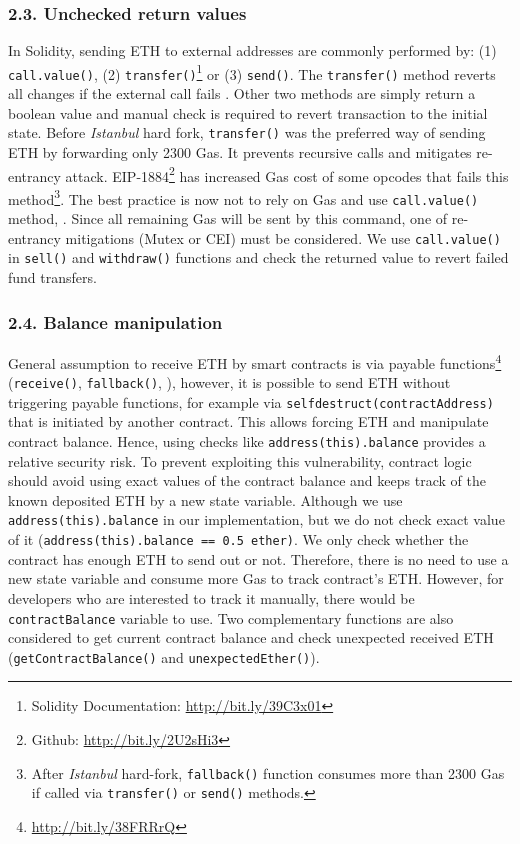 \subsubsection*{2.3. Unchecked return values}
In Solidity, sending ETH to external addresses are commonly performed by: (1) \texttt{call.value()}, (2) \texttt{transfer()}\footnote{Solidity Documentation: \url{http://bit.ly/39C3x01}} or (3) \texttt{send()}. The \texttt{transfer()} method reverts all changes if the external call fails \cite{SoliditySendEther}. Other two methods are simply return a boolean value and manual check is required to revert transaction to the initial state. Before \textit{Istanbul} hard fork\cite{IstanbulUpgrades}, \texttt{transfer()} was the preferred way of sending ETH by forwarding only 2300 Gas. It prevents recursive calls and mitigates re-entrancy attack. EIP-1884\footnote{Github: \url{http://bit.ly/2U2sHi3}} has increased Gas cost of some opcodes that fails this method\footnote{After \textit{Istanbul} hard-fork, \texttt{fallback()} function consumes more than 2300 Gas if called via \texttt{transfer()} or \texttt{send()} methods.}. The best practice is now not to rely on Gas and use \texttt{call.value()} method\cite{ConsensysStopTran}, \cite{ChainSecurity}. Since all remaining Gas will be sent by this command, one of re-entrancy mitigations (\ie Mutex or CEI) must be considered. We use \texttt{call.value()} in \texttt{sell()} and \texttt{withdraw()} functions and check the returned value to revert failed fund transfers.

\subsubsection*{2.4. Balance manipulation}
General assumption to receive ETH by smart contracts is via payable functions\footnote{\url{http://bit.ly/38FRRrQ}} (\ie \texttt{receive()}, \texttt{fallback()}, \etc), however, it is possible to send ETH without triggering payable functions, for example via \texttt{selfdestruct(contractAddress)} that is initiated by another contract. This allows forcing ETH and manipulate contract balance\cite{UnexpectedEth}. Hence, using checks like \texttt{address(this).balance} provides a relative security risk. To prevent exploiting this vulnerability, contract logic should avoid using exact values of the contract balance and keeps track of the known deposited ETH by a new state variable. Although we use \texttt{address(this).balance} in our implementation, but we do not check exact value of it (\ie  \texttt{address(this).balance == 0.5 ether)}. We only check whether the contract has enough ETH to send out or not. Therefore, there is no need to use a new state variable and consume more Gas to track contract's ETH. However, for developers who are interested to track it manually, there would be \texttt{contractBalance} variable to use. Two complementary functions are also considered to get current contract balance and check unexpected received ETH (\ie \texttt{getContractBalance()} and \texttt{unexpectedEther()}).

